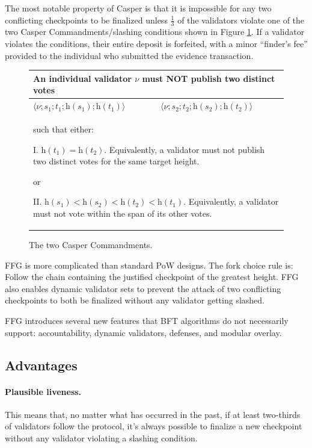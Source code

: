 \documentclass[lang=en]{sjtuarticle}
\begin{document}
The most notable property of Casper is that it is impossible for any two conflicting checkpoints to be finalized
unless $\frac{1}{3}$ of the validators violate one of the two Casper Commandments/slashing conditions shown in Figure \ref{fig:ctwo}. If a validator violates the conditions, their entire deposit is forfeited, with a minor ``finder's fee'' provided to the individual who submitted the evidence transaction.

\begin{figure}[h]
    \centering
    \begin{tabular}[h]{|p{5cm}|p{5cm}|}
        \hline
        \multicolumn{2}{|p{10cm}|}{
            An individual validator $\nu$ must NOT publish two distinct votes
        }\\
        \hline
        $\langle\nu; s_1; t_1; \mathrm{h}(s_1); \mathrm{h}(t_1)\rangle$ & $\langle\nu; s_2; t_2; \mathrm{h}(s_2); \mathrm{h}(t_2)\rangle$ \\
        \hline
        \multicolumn{2}{|p{10cm}|}{
            such that either:\par
            I. $\mathrm{h}(t_1) = \mathrm{h}(t_2)$.
Equivalently, a validator must not publish two distinct votes for the same target height.\par
or\par
II. $\mathrm{h}(s_1) < \mathrm{h}(s_2) < \mathrm{h}(t_2) < \mathrm{h}(t_1)$.
Equivalently, a validator must not vote within the span of its other votes.
        } \\
        \hline
    \end{tabular}    
    \caption{The two Casper Commandments.}
    \label{fig:ctwo}
\end{figure}

FFG is more complicated than standard PoW designs. The fork choice rule is: Follow the chain containing the justified checkpoint of the greatest height. FFG also enables dynamic validator sets to prevent the attack of two conflicting checkpoints to both be finalized without any validator getting slashed.

FFG introduces several new features that BFT algorithms do not necessarily support: accountability, dynamic validators, defenses, and modular overlay.

\subsection{Advantages}

\paragraph{Plausible liveness.} This means that, no matter what has occurred in the past, if at least two-thirds of validators follow the protocol, it's always possible to finalize a new checkpoint without any validator violating a slashing condition.
\end{document}
